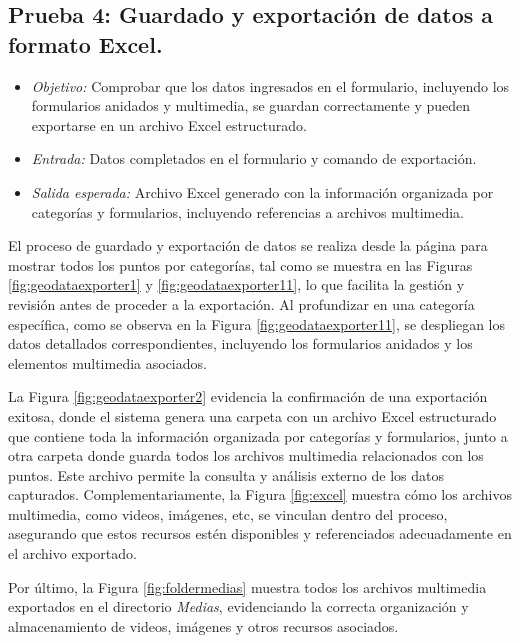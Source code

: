 \documentclass{article}
\begin{document}
\subsection{Prueba 4: Guardado y exportación de datos a formato Excel.}
\begin{itemize}
  \item \textit{Objetivo:} Comprobar que los datos ingresados en el formulario, incluyendo los formularios anidados y multimedia, se guardan correctamente y pueden exportarse en un archivo Excel estructurado.
  \item \textit{Entrada:} Datos completados en el formulario y comando de exportación.
  \item \textit{Salida esperada:} Archivo Excel generado con la información organizada por categorías y formularios, incluyendo referencias a archivos multimedia.
\end{itemize}

El proceso de guardado y exportación de datos se realiza desde la página para mostrar todos los puntos por categorías, tal como se muestra en las Figuras \ref{fig:geodataexporter1} y \ref{fig:geodataexporter11}, lo que facilita la gestión y revisión antes de proceder a la exportación. Al profundizar en una categoría específica, como se observa en la Figura \ref{fig:geodataexporter11}, se despliegan los datos detallados correspondientes, incluyendo los formularios anidados y los elementos multimedia asociados. 

La Figura \ref{fig:geodataexporter2} evidencia la confirmación de una exportación exitosa, donde el sistema genera una carpeta con un archivo Excel estructurado que contiene toda la información organizada por categorías y formularios, junto a otra carpeta donde guarda todos los archivos multimedia relacionados con los puntos. Este archivo permite la consulta y análisis externo de los datos capturados. Complementariamente, la Figura \ref{fig:excel} muestra cómo los archivos multimedia, como videos, imágenes, etc, se vinculan dentro del proceso, asegurando que estos recursos estén disponibles y referenciados adecuadamente en el archivo exportado.

Por último, la Figura \ref{fig:foldermedias} muestra todos los archivos multimedia exportados en el directorio \textit{Medias}, evidenciando la correcta organización y almacenamiento de videos, imágenes y otros recursos asociados.
\end{document}
